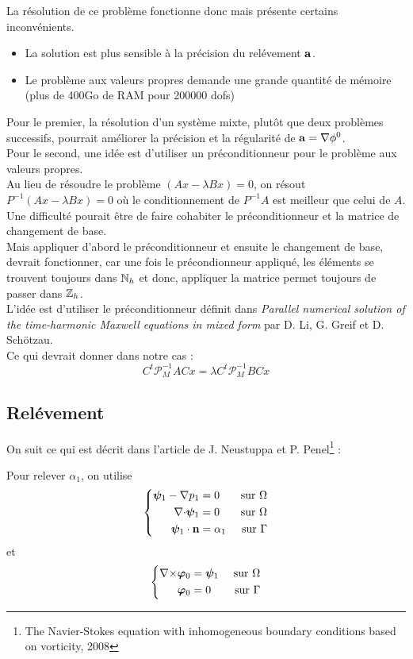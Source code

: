 \documentclass[a4paper,11pt]{article}
\begin{document}
La résolution de ce problème fonctionne donc mais présente certains inconvénients.
\begin{itemize}
\item
  La solution est plus sensible à la précision du relévement ${\mathbf{a}}$.
\item
  Le problème aux valeurs propres demande une grande quantité de mémoire (plus de 400Go de RAM pour 200000 dofs)
\end{itemize}
Pour le premier, la résolution d'un système mixte, plutôt que deux problèmes successifs, pourrait améliorer la précision et la régularité de ${\mathbf{a}} = {\nabla}\phi^0$.\\
Pour le second, une idée est d'utiliser un préconditionneur pour le problème aux valeurs propres.\\
Au lieu de résoudre le problème $(Ax-\lambda Bx) = 0$, on résout $P^{-1}(Ax-\lambda Bx) = 0$ où le conditionnement de $P^{-1}A$ est meilleur que celui de $A$. Une difficulté pourait être de faire cohabiter le préconditionneur et la matrice de changement de base.\\
Mais appliquer d'abord le préconditionneur et ensuite le changement de base, devrait fonctionner, car une fois le précondionneur appliqué, les éléments se trouvent toujours dans ${\mathbb{N}}_h$ et donc, appliquer la matrice permet toujours de passer dans ${\mathbb{Z}}_h$.\\

L'idée est d'utiliser le préconditionneur définit dans \textit{Parallel numerical solution of the time-harmonic Maxwell equations in mixed form} par D. Li, G. Greif et D. Schötzau.\\

Ce qui devrait donner dans notre cas :
\[ C^t \mathscr{P}_M^{-1}ACx = \lambda C^t \mathscr{P}_M^{-1}BCx \]


\iffalse
\subsection{Relévement}
\label{relev}
On suit ce qui est décrit dans l'article de J. Neustuppa et P. Penel\footnote{The Navier-Stokes equation with inhomogeneous boundary conditions based on vorticity, 2008} :

Pour relever $\alpha_1$, on utilise
\begin{equation}\label{a1}
  \left\{
  \begin{aligned}
    \bm{\psi}_1 - {\nabla} p_1 &= 0 &\mbox{ sur }\Omega\\
    {\nabla\cdot}\bm{\psi}_1 &= 0 &\mbox{ sur }\Omega\\
    \bm{\psi}_1\cdot{\mathbf{n}} &= \alpha_1 &\mbox{ sur }\Gamma
  \end{aligned}
  \right.
\end{equation}
et
\begin{equation}
  \left\{
  \begin{aligned}
    {\nabla\times}\bm{\varphi}_0 &= \bm{\psi}_1 &\mbox{ sur }\Omega\\
    \bm{\varphi}_0 &= 0 &\mbox{ sur }\Gamma
  \end{aligned}
  \right.
\end{equation}
\end{document}
